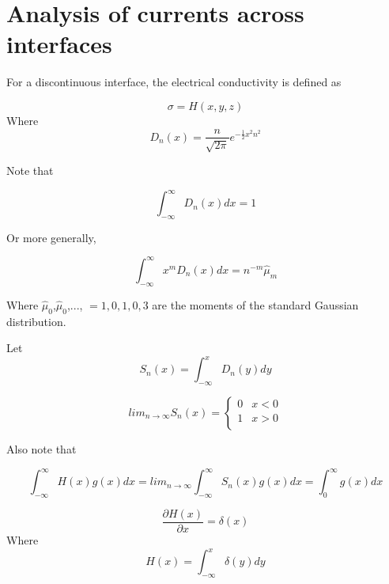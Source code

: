 \documentclass[11pt]{article}
\begin{document}
\doublespacing
\MOONSTITLE
\maketitle

\section{Analysis of currents across interfaces}

For a discontinuous interface, the electrical conductivity is defined as

\begin{equation}
	\sigma = H(x,y,z)
\end{equation}
Where
\begin{equation}
	D_n(x) = \frac{n}{\sqrt{2\pi}} e^{- \frac{1}{2}x^2n^2}
\end{equation}

Note that

\begin{equation}
	\int_{-\infty}^{\infty} D_n(x) dx = 1
\end{equation}

Or more generally,

\begin{equation}
	\int_{-\infty}^{\infty} x^m D_n(x) dx = n^{-m} \hat{\mu}_m
\end{equation}

Where $\hat{\mu}_0$,$\hat{\mu}_0$,..., $=1,0,1,0,3$ are the moments of the standard Gaussian distribution.

Let
\begin{equation}
	S_n(x) = \int_{-\infty}^{x} D_n(y) dy
\end{equation}

\begin{equation}
	lim_{n\rightarrow \infty} S_n(x)
	=
	\begin{cases}
	0 & x<0 \\
	1 & x>0 \\
	\end{cases}
\end{equation}

Also note that

\begin{equation}
	\int_{-\infty}^{\infty} H(x) g(x) dx
	=
	lim_{n\rightarrow \infty}
	\int_{-\infty}^{\infty} S_n(x) g(x) dx
	=
	\int_0^{\infty} g(x) dx
\end{equation}

\begin{equation}
	\frac{\partial H(x)}{\partial x} = \delta (x)
\end{equation}
Where
\begin{equation}
	H(x) = \int_{-\infty}^{x} \delta (y) dy
\end{equation}
\end{document}
